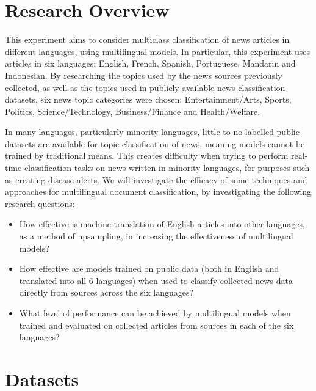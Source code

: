 \documentclass{l4proj}
\begin{document}
\section{Research Overview}
This experiment aims to consider multiclass classification of news articles in different languages, using multilingual models. In particular, this experiment uses articles in six languages: English, French, Spanish, Portuguese, Mandarin and Indonesian. By researching the topics used by the news sources previously collected, as well as the topics used in publicly available news classification datasets, six news topic categories were chosen: Entertainment/Arts, Sports, Politics, Science/Technology, Business/Finance and Health/Welfare. 

In many languages, particularly minority languages, little to no labelled public datasets are available for topic classification of news, meaning models cannot be trained by traditional means. This creates difficulty when trying to perform real-time classification tasks on news written in minority languages, for purposes such as creating disease alerts. We will investigate the efficacy of some techniques and approaches for multilingual document classification, by investigating the following research questions: 
\begin{itemize}
\item How effective is machine translation of English articles into other languages, as a method of upsampling, in increasing the effectiveness of multilingual models? 
\item How effective are models trained on public data (both in English and translated into all 6 languages) when used to classify collected news data directly from sources across the six languages? 
\item What level of performance can be achieved by multilingual models when trained and evaluated on collected articles from sources in each of the six languages?
\end{itemize}

\section{Datasets}
\end{document}
